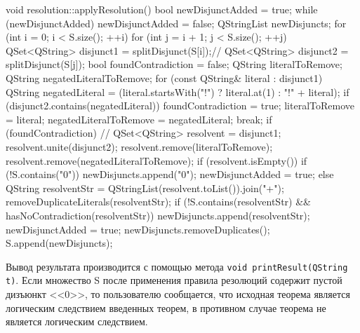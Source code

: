 \documentclass[12pt, a4paper]{article}
\begin{document}
	 \begin{cppcode}[caption = Метод void applyResolution().]
	 	void resolution::applyResolution()
	 	{
	 		bool newDisjunctAdded = true;
	 		while (newDisjunctAdded) {
	 			newDisjunctAdded = false;
	 			QStringList newDisjuncts;
	 			for (int i = 0; i < S.size(); ++i) {
	 				for (int j = i + 1; j < S.size(); ++j) {
	 					QSet<QString> disjunct1 = splitDisjunct(S[i]);//
	 					QSet<QString> disjunct2 = splitDisjunct(S[j]);
	 					bool foundContradiction = false;
	 					QString literalToRemove;
	 					QString negatedLiteralToRemove;
	 					for (const QString& literal : disjunct1) {
	 						QString negatedLiteral = (literal.startsWith("!") ? literal.at(1) : "!" + literal);
	 						if (disjunct2.contains(negatedLiteral)) {
	 							foundContradiction = true;
	 							literalToRemove = literal;
	 							negatedLiteralToRemove = negatedLiteral;
	 							break;
	 						}
	 					}
	 					if (foundContradiction) {//
	 						QSet<QString> resolvent = disjunct1;
	 						resolvent.unite(disjunct2);
	 						resolvent.remove(literalToRemove);
	 						resolvent.remove(negatedLiteralToRemove);
	 						if (resolvent.isEmpty()) {
	 							if (!S.contains("0")) {
	 								newDisjuncts.append("0");
	 								newDisjunctAdded = true;
	 							}
	 						} else {
	 							QString resolventStr = QStringList(resolvent.toList()).join("+");
	 							removeDuplicateLiterals(resolventStr);
	 							if (!S.contains(resolventStr) && hasNoContradiction(resolventStr)) {
	 								newDisjuncts.append(resolventStr);
	 								newDisjunctAdded = true;
	 							}
	 						}
	 					}
	 				}
	 			}
	 			newDisjuncts.removeDuplicates();
	 			S.append(newDisjuncts);
	 		}
	 	}
	 \end{cppcode}
	 \par Вывод результата производится с помощью метода \texttt{void printResult(QString t)}. Если множество S после применения правила резолюций содержит пустой дизъюнкт <<0>>, то пользователю сообщается, что исходная теорема является логическим следствием введенных теорем, в противном случае теорема не является логическим следствием.
	  \newpage
	 
\end{document}
